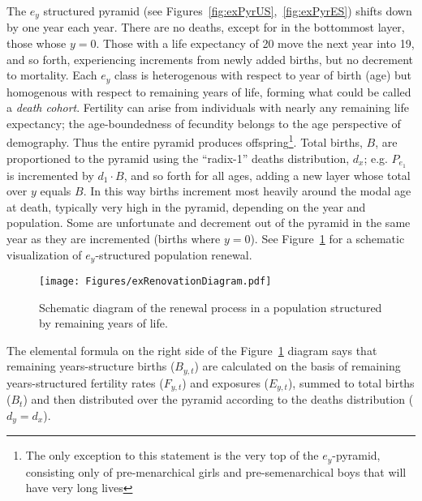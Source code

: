  \FloatBarrier
\label{sec:exrenewal}
The $e_y$ structured pyramid (see Figures~\ref{fig:exPyrUS},~\ref{fig:exPyrES})
shifts down by one year each year. There are no deaths, except for in 
the bottommost layer, those whose $y = 0$. Those with a life
expectancy of 20 move the next year into 19, and so forth, experiencing
increments from newly added births, but no decrement to mortality. 
Each $e_y$ class is heterogenous with 
respect to year of birth (age) but homogenous with respect to remaining 
years of life, forming what could be called a \textit{death cohort}. Fertility
can arise from individuals with nearly any remaining life expectancy; the 
age-boundedness of fecundity belongs to the age
perspective of demography. Thus the entire pyramid produces 
offspring\footnote{The only exception
to this statement is the very top of the $e_y$-pyramid, consisting only of
pre-menarchical girls and pre-semenarchical boys that will have very long
lives}. Total births, $B$, are proportioned to the pyramid using the ``radix-1''
deaths distribution, $d_x$; e.g. $P_{e_1}$ is incremented by $d_1 \cdot B$, and
so forth for all ages, adding a new layer whose total over $y$ equals $B$. In 
this way births
increment most heavily around the modal age at death, typically very high in the
pyramid, depending on the year and population. Some are
unfortunate and decrement out of the pyramid in the same year as they are
incremented (births where $y = 0$). See Figure~\ref{fig:exrenewal} for a
schematic visualization of $e_y$-structured population renewal.

\begin{figure}[ht!]
\begin{adjustwidth}{-1in}{1in}
        \centering  
          \caption{Schematic diagram of the renewal process in a population
          structured by remaining years of life.}
           \texttt{[image: Figures/exRenovationDiagram.pdf]}
          \label{fig:exrenewal}
          \end{adjustwidth}
\end{figure}

The elemental formula on the right side of the Figure~\ref{fig:exrenewal}
diagram says that remaining years-structure births ($B_{y,t}$) are calculated on
the basis of remaining years-structured fertility rates ($F_{y,t}$) and
exposures ($E_{y,t}$), summed to total births ($B_t$) and then distributed over
the pyramid according to the deaths distribution ($d_y = d_x$).
